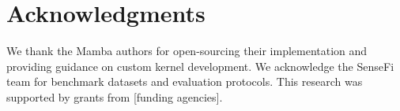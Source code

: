 \documentclass[10pt,journal,compsoc]{IEEEtran}
\begin{document}
\section*{Acknowledgments}

We thank the Mamba authors for open-sourcing their implementation and providing guidance on custom kernel development. We acknowledge the SenseFi team for benchmark datasets and evaluation protocols. This research was supported by grants from [funding agencies].



\end{document}
